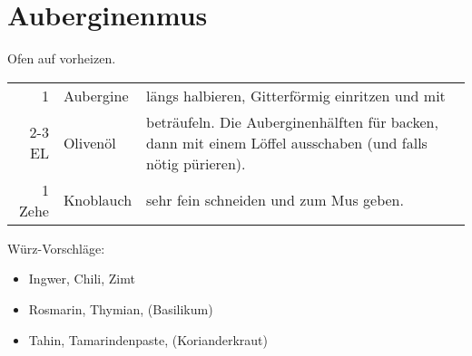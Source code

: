 \section{Auberginenmus}
Ofen auf  vorheizen.
\begin{longtable}{rlL{17.5cm}}
	1		&	Aubergine	&	längs halbieren, Gitterförmig einritzen und mit	\\
	2-3 EL	&	Olivenöl	&	beträufeln. Die Auberginenhälften für  backen, dann mit einem Löffel ausschaben (und falls nötig pürieren).	\\
	1 Zehe	&	Knoblauch	&	sehr fein schneiden und zum Mus geben.	\\
\end{longtable}

Würz-Vorschläge:
\begin{itemize}
	\item Ingwer, Chili, Zimt
	\item Rosmarin, Thymian, (Basilikum)
	\item Tahin, Tamarindenpaste, (Korianderkraut)
\end{itemize}